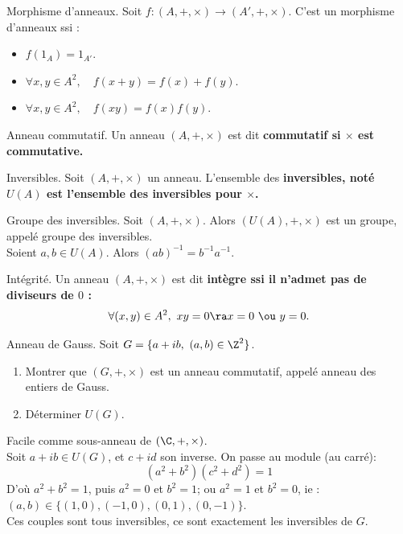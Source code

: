\documentclass[11pt]{article}
\begin{document}
\begin{rappel}{Morphisme d'anneaux.}{}
    Soit $f:(A,+,\times)\to(A',+,\times)$. C'est un morphisme d'anneaux ssi :
    \begin{itemize}
        \item $f(1_A)=1_{A'}$.
        \item $\forall x,y \in A^2, \quad f(x+y)=f(x)+f(y)$.
        \item $\forall x,y \in A^2, \quad f(xy)=f(x)f(y)$.
    \end{itemize}
\end{rappel}

\begin{defi}{Anneau commutatif.}{}
    Un anneau $(A,+,\times)$ est dit \bf{commutatif} si $\times$ est commutative.
\end{defi}

\begin{defi}{Inversibles.}{}
    Soit $(A,+,\times)$ un anneau. L'ensemble des \bf{inversibles}, noté $U(A)$ est l'ensemble des inversibles pour $\times$.
\end{defi}

\begin{rappel}{Groupe des inversibles.}{}
    Soit $(A,+,\times)$. Alors $(U(A),+,\times)$ est un groupe, appelé groupe des inversibles.\\
    Soient $a,b\in U(A)$. Alors $(ab)^{-1}=b^{-1}a^{-1}$.
\end{rappel}

\begin{defi}{Intégrité.}{}
    Un anneau $(A,+,\times)$ est dit \bf{intègre} ssi il n'admet pas de diviseurs de $0$ :
    \begin{equation*}
        \forall (x,y) \in A^2, ~ xy = 0 \ra x = 0 ~\ou~ y = 0.
    \end{equation*}
\end{defi}

\begin{ex}{Anneau de Gauss.}{}
    Soit $G=\{a+ib, ~ (a,b)\in\Z^2\}$.
    \begin{enumerate}
        \item Montrer que $(G,+,\times)$ est un anneau commutatif, appelé anneau des entiers de Gauss.
        \item Déterminer $U(G)$. 
    \end{enumerate}
    \tcblower
     Facile comme sous-anneau de $(\C,+,\times)$.\\
     Soit $a+ib\in U(G)$, et $c+id$ son inverse. On passe au module (au carré):
    \begin{equation*}
        (a^2+b^2)(c^2+d^2)=1
    \end{equation*}
    D'où $a^2+b^2=1$, puis $a^2=0$ et $b^2=1$; ou $a^2=1$ et $b^2=0$, ie : $(a,b)\in\{(1,0),(-1,0),(0,1),(0,-1)\}$.\\
    Ces couples sont tous inversibles, ce sont exactement les inversibles de $G$.
\end{ex}
\end{document}
